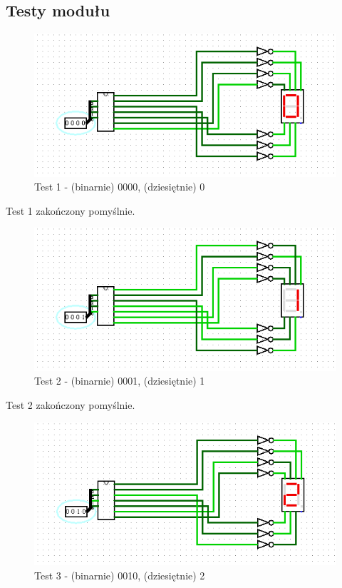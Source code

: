 \subsection{Testy modułu}\label{subsec:module-tests}
\begin{figure}[h]
    \includegraphics[width=\linewidth]{ScreenshotsTests/Comp 1/Comp 1_00009.png}
    \caption{Test 1 - (binarnie) 0000, (dziesiętnie) 0}
    \label{fig:test0}
\end{figure}

Test 1 zakończony pomyślnie.

\begin{figure}[H]
    \includegraphics[width=\linewidth]{ScreenshotsTests/Comp 1/Comp 1_00008.png}
    \caption{Test 2 - (binarnie) 0001, (dziesiętnie) 1}
    \label{fig:test1}
\end{figure}

Test 2 zakończony pomyślnie.

\begin{figure}[H]
    \includegraphics[width=\linewidth]{ScreenshotsTests/Comp 1/Comp 1_00007.png}
    \caption{Test 3 - (binarnie) 0010, (dziesiętnie) 2}
    \label{fig:test2}
\end{figure}

